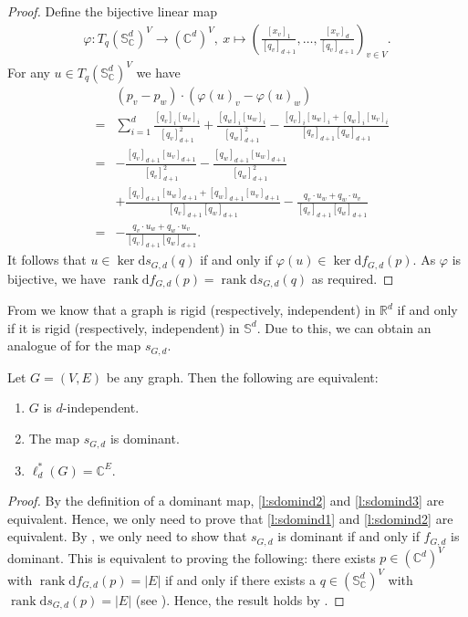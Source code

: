 \documentclass[ALCO]{cedram}
\DeclareMathOperator{\rank}{rank}
\newcommand{\diff}{\mathrm{d}}
\begin{document}
\begin{proof}
	Define the bijective linear map
	\begin{align*}
		\varphi \colon T_q (\mathbb{S}_{\mathbb{C}}^{d})^{V} \rightarrow (\mathbb{C}^{d})^V, ~ x \mapsto \left( \frac{[x_v]_1}{[q_v]_{d+1}},\ldots, \frac{[x_v]_d}{[q_v]_{d+1}} \right)_{v \in V}.
	\end{align*}
	For any $u \in T_q (\mathbb{S}_{\mathbb{C}}^{d})^{V}$ we have
	\begin{eqnarray*}
		&~& (p_v-p_w)\cdot (\varphi(u)_v- \varphi(u)_w)\\
		&=& \sum_{i=1}^d \frac{[q_v]_i[u_v]_i}{[q_v]^2_{d+1}} +\frac{[q_w]_i[u_w]_i}{[q_w]^2_{d+1}} - \frac{[q_v]_i[u_w]_i + [q_w]_i[u_v]_i}{[q_v]_{d+1}[q_w]_{d+1}} \\
		&=& -\frac{[q_v]_{d+1}[u_v]_{d+1}}{[q_v]^2_{d+1}}-\frac{[q_w]_{d+1}[u_w]_{d+1}}{[q_w]^2_{d+1}} \\
		&&+ \frac{[q_v]_{d+1}[u_w]_{d+1} +[q_w]_{d+1}[u_v]_{d+1}}{[q_v]_{d+1}[q_w]_{d+1}} - \frac{q_v\cdot u_w + q_w \cdot u_v}{[q_v]_{d+1}[q_w]_{d+1}} \\
		&=& - \frac{q_v \cdot u_w + q_w \cdot u_v}{[q_v]_{d+1}[q_w]_{d+1}}.
	\end{eqnarray*}
		It follows that $u \in \ker \diff s_{G,d}(q)$ if and only if $\varphi(u) \in \ker \diff f_{G,d}(p)$.
		As $\varphi$ is bijective,
		we have $\rank \diff f_{G,d}(p)= \rank \diff s_{G,d}(q)$ as required.
\end{proof}

From  we know that a graph is rigid (respectively, independent) in $\mathbb{R}^d$ if and only if it is rigid (respectively, independent) in $\mathbb{S}^d$.
Due to this, we can obtain an analogue of  for the map $s_{G,d}$.

\begin{lemma}\label{l:domindsphere}
	Let $G=(V,E)$ be any graph.
	Then the following are equivalent:
	\begin{enumerate}
		\item \label{l:sdomind1} $G$ is $d$-independent.
		\item \label{l:sdomind2} The map $s_{G,d}$ is dominant.	
		\item \label{l:sdomind3} $\ell_d^*(G) = \mathbb{C}^E$.
	\end{enumerate}
\end{lemma} 

\begin{proof}
	By the definition of a dominant map, \ref{l:sdomind2} and \ref{l:sdomind3} are equivalent.
	Hence, we only need to prove that \ref{l:sdomind1} and \ref{l:sdomind2} are equivalent.
	By ,
	we only need to show that $s_{G,d}$ is dominant if and only if $f_{G,d}$ is dominant.
	This is equivalent to proving the following:
	there exists $p \in (\mathbb{C}^{d})^V$ with $\rank \diff f_{G,d}(p) = |E|$ if and only if
	there exists a $q \in (\mathbb{S}_{\mathbb{C}}^{d})^V$ with $\rank \diff s_{G,d}(p) = |E|$ (see ).
	Hence, the result holds by .
\end{proof}
\end{document}
